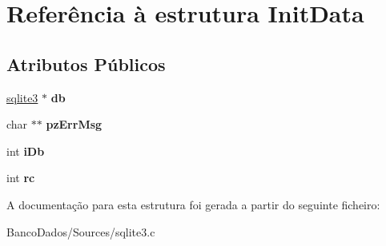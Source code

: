 \hypertarget{struct_init_data}{\section{Referência à estrutura Init\-Data}
\label{struct_init_data}
}
\subsection*{Atributos Públicos}
\begin{DoxyCompactItemize}
\item 
\hypertarget{struct_init_data_adc9e29c56e0392076e92d7f4b29fa272}{\hyperlink{structsqlite3}{sqlite3} $\ast$ {\bfseries db}}\label{struct_init_data_adc9e29c56e0392076e92d7f4b29fa272}

\item 
\hypertarget{struct_init_data_aa8aef34241ec214f038b38932ffe1357}{char $\ast$$\ast$ {\bfseries pz\-Err\-Msg}}\label{struct_init_data_aa8aef34241ec214f038b38932ffe1357}

\item 
\hypertarget{struct_init_data_ad6c7953b49d351cd9fb14e3394010689}{int {\bfseries i\-Db}}\label{struct_init_data_ad6c7953b49d351cd9fb14e3394010689}

\item 
\hypertarget{struct_init_data_a627153a3de2c4d159ae44ebc03961592}{int {\bfseries rc}}\label{struct_init_data_a627153a3de2c4d159ae44ebc03961592}

\end{DoxyCompactItemize}


A documentação para esta estrutura foi gerada a partir do seguinte ficheiro\-:\begin{DoxyCompactItemize}
\item 
Banco\-Dados/\-Sources/sqlite3.\-c\end{DoxyCompactItemize}
